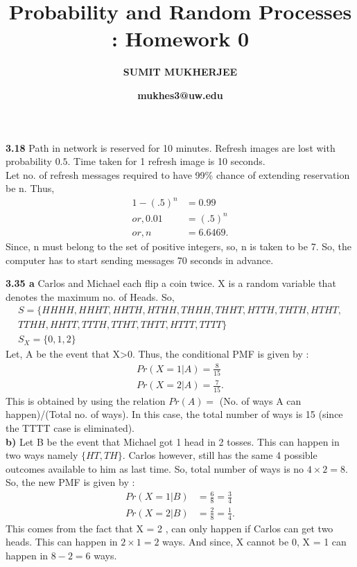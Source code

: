 \documentclass{article}
\title{Probability and Random Processes : Homework 0}
\author{\bf SUMIT MUKHERJEE}
\date{\bf  mukhes3@uw.edu}
\begin{document}
\maketitle%
\vspace{5 mm}

{\bf 3.18} Path in network is reserved for 10 minutes. Refresh images are lost with probability $0.5$. Time taken for 1 refresh image is 10 seconds. \\
Let no. of refresh messages required to have 99\% chance of extending reservation be n. Thus,
\begin{align*}
1 - (.5)^n &= 0.99 \\
or, 0.01 &= (.5)^n \\
or, n &= 6.6469.   
\end{align*}
Since, n must belong to the set of positive integers, so, n is taken to be 7. So, the computer has to start sending messages 70 seconds in advance. 

\vspace{5 mm}

{\bf 3.35 a} Carlos and Michael each flip a coin twice. X is a random variable that denotes the maximum no. of Heads. So, 
\begin{align*}
S = \{HHHH, HHHT,HHTH,HTHH,THHH,THHT,HTTH,THTH,HTHT, \\ TTHH,HHTT, TTTH, TTHT, THTT, HTTT, TTTT\} \\
S_X = \{ 0,1,2 \}
\end{align*}
Let, A be the event that X>0. Thus, the conditional PMF is given by :
\begin{align*}
Pr ( X = 1 | A) = \frac{8}{15}\\
Pr ( X = 2 | A) = \frac{7}{15}. 
\end{align*}
This is obtained by using the relation $Pr(A) = $ (No. of ways A can happen)/(Total no. of ways). In this case, the total number of ways is 15 (since the TTTT case is eliminated). \\

{\bf b)} Let B be the event that Michael got 1 head in 2 tosses. This can happen in two ways namely $\{HT,TH\}$. Carlos however, still has the same 4 possible outcomes available to him as last time. So, total number of ways is no $4 \times 2 = 8$. So, the new PMF is given by :
\begin{align*}
Pr ( X = 1 | B) &= \frac{6}{8} = \frac{3}{4}\\
Pr ( X = 2 | B) &= \frac{2}{8} = \frac{1}{4}. 
\end{align*} 
This comes from the fact that X = 2 , can only happen if Carlos can get two heads. This can happen in $2 \times 1 = 2$ ways. And since, X cannot be 0, X = 1 can happen in $8 - 2 = 6$ ways. \\
\end{document}
